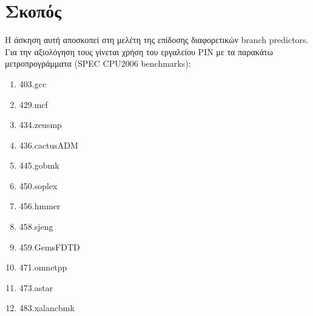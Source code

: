 \documentclass[12pt]{article}
\begin{document}
\large{
\setcounter{tocdepth}{3}
\setcounter{secnumdepth}{3}
\section{Σκοπός}
\vspace{3mm}

Η άσκηση αυτή αποσκοπεί στη μελέτη της επίδοσης διαφορετικών branch predictors.
Για την αξιολόγηση τους γίνεται χρήση του εργαλείου PIN με τα παρακάτω
μετροπρογράμματα (SPEC CPU2006 benchmarks): 

\begin{enumerate}
  \item 403.gcc 
  \item 429.mcf 
  \item 434.zeusmp
  \item 436.cactusADM 
  \item 445.gobmk
  \item 450.soplex
  \item 456.hmmer
  \item 458.sjeng
  \item 459.GemsFDTD
  \item 471.omnetpp
  \item 473.astar
  \item 483.xalancbmk
\end{enumerate}}

\vspace{3mm}







\end{document}
